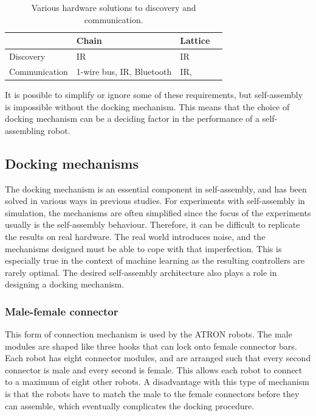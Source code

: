 \begin{table}[H]
	\centering
	
	\begin{tabular}{ | l | l | l |p{5cm} |}
		\hline
		& Chain 						& Lattice \\ \hline
		Discovery 		& IR\cite{castano_conro:_2000}  & IR\cite{gilpin_miche:_2008} \\ \hline
		Communication 	& 1-wire bus\cite{zykov_molecubes:_2007}, IR\cite{castano_conro:_2000}, Bluetooth{\cite{mockel_yamor_2006}} & IR\cite{brandt_atron_2007},\cite{gilpin_miche:_2008}  \\\hline
	\end{tabular}
	\caption{Various hardware solutions to discovery and communication.}
	\label{tab:hardware-mechanisms}
\end{table}


It is possible to simplify or ignore some of these requirements, but self-assembly is impossible without the docking mechanism.
This means that the choice of docking mechanism can be a deciding factor in the performance of a self-assembling robot. 


\subsection{Docking mechanisms}
The docking mechanism is an essential component in self-assembly, and has been solved in various ways in previous studies.
For experiments with self-assembly in simulation, the mechanisms are often simplified since the focus of the experiments usually is the self-assembly behaviour.
Therefore, it can be difficult to replicate the results on real hardware.
The real world introduces noise, and the mechanisms designed must be able to cope with that imperfection.
This is especially true in the context of machine learning as the resulting controllers are rarely optimal.
The desired self-assembly architecture also plays a role in designing a docking mechanism.

\subsubsection*{Male-female connector}
This form of connection mechanism is used by the ATRON\cite{brandt_atron_2007} robots.
The male modules are shaped like three hooks that can lock onto female connector bars.
Each robot has eight connector modules, and are arranged such that every second connector is male and every second is female.
This allows each robot to connect to a maximum of eight other robots.
A disadvantage with this type of mechanism is that the robots have to match the male to the female connectors before they can assemble, which eventually complicates the docking procedure.

